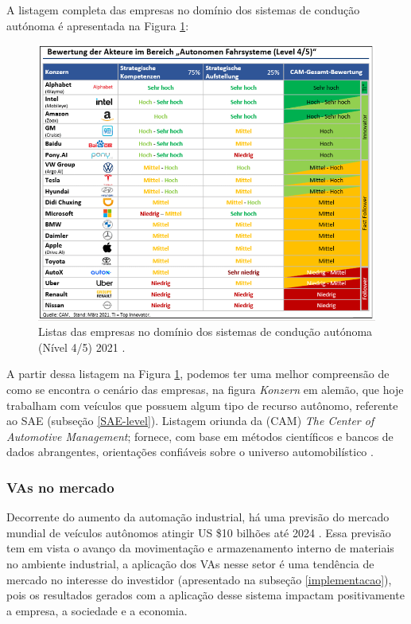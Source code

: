 A listagem completa das empresas no domínio dos sistemas de condução autónoma é apresentada na Figura \ref{figura_companies}:
\begin{figure}[H]
\centering
\includegraphics[width=16cm]{Figures/grafik.png}
\caption{Listas das empresas no domínio dos sistemas de condução autónoma (Nível 4/5) 2021 \cite{CAM}.}
\label{figura_companies}
\end{figure}
A partir dessa listagem na Figura \ref{figura_companies}, podemos ter uma melhor compreensão de como se encontra o cenário das empresas, na figura \textit{Konzern} em alemão, que hoje trabalham com veículos que possuem algum tipo de recurso autônomo, referente ao SAE (subseção \ref{SAE-level}). Listagem oriunda da (CAM) \textit{The Center of Automotive Management}; fornece, com base em métodos científicos e bancos de dados abrangentes, orientações confiáveis sobre o universo automobilístico \cite{CAM}.

\subsubsection{VAs no mercado}
Decorrente do aumento da automação industrial, há uma previsão do mercado mundial de veículos autônomos atingir US \$10 bilhões até 2024 \cite{mercadoo}. Essa previsão tem em vista o avanço da movimentação e armazenamento interno de materiais no ambiente industrial, a aplicação dos VAs nesse setor é uma tendência de mercado no interesse do investidor (apresentado na subseção \ref{implementacao}), pois os resultados gerados com a aplicação desse sistema impactam positivamente a empresa, a sociedade e a economia.


